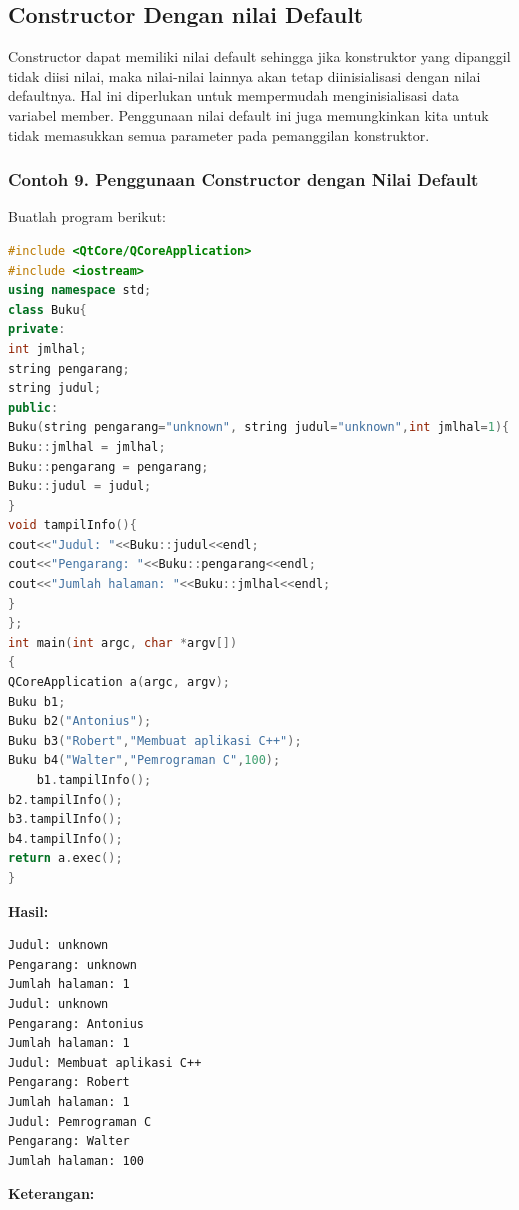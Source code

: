 \subsection{Constructor Dengan nilai
Default}\label{constructor-dengan-nilai-default}

Constructor dapat memiliki nilai default sehingga jika konstruktor yang
dipanggil tidak diisi nilai, maka nilai-nilai lainnya akan tetap
diinisialisasi dengan nilai defaultnya. Hal ini diperlukan untuk
mempermudah menginisialisasi data variabel member. Penggunaan nilai
default ini juga memungkinkan kita untuk tidak memasukkan semua
parameter pada pemanggilan konstruktor.

\subsubsection*{Contoh 9. Penggunaan Constructor dengan Nilai Default}

Buatlah program berikut:

\begin{lstlisting}[language=c++]
#include <QtCore/QCoreApplication>
#include <iostream>
using namespace std;
class Buku{
private:
int jmlhal;
string pengarang;
string judul;
public:
Buku(string pengarang="unknown", string judul="unknown",int jmlhal=1){
Buku::jmlhal = jmlhal;
Buku::pengarang = pengarang;
Buku::judul = judul;
}
void tampilInfo(){
cout<<"Judul: "<<Buku::judul<<endl;
cout<<"Pengarang: "<<Buku::pengarang<<endl;
cout<<"Jumlah halaman: "<<Buku::jmlhal<<endl;
}
};
int main(int argc, char *argv[])
{
QCoreApplication a(argc, argv);
Buku b1;
Buku b2("Antonius");
Buku b3("Robert","Membuat aplikasi C++");
Buku b4("Walter","Pemrograman C",100);
    b1.tampilInfo();
b2.tampilInfo();
b3.tampilInfo();
b4.tampilInfo();
return a.exec();
}
\end{lstlisting}

\textbf{Hasil:}

\begin{verbatim}
Judul: unknown
Pengarang: unknown
Jumlah halaman: 1
Judul: unknown
Pengarang: Antonius
Jumlah halaman: 1
Judul: Membuat aplikasi C++
Pengarang: Robert
Jumlah halaman: 1
Judul: Pemrograman C
Pengarang: Walter
Jumlah halaman: 100
\end{verbatim}
\textbf{Keterangan:}

